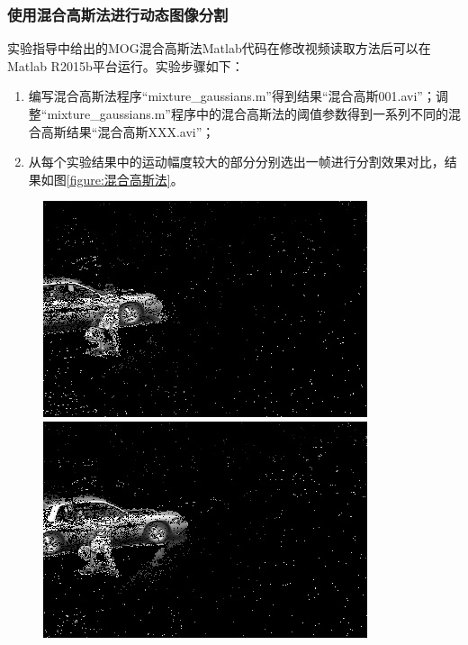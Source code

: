 \documentclass[a4paper]{ctexart}
\begin{document}
\subsubsection{使用混合高斯法进行动态图像分割}
实验指导中给出的MOG混合高斯法Matlab代码在修改视频读取方法后可以在Matlab R2015b平台运行。实验步骤如下：
\begin{enumerate}[label=\arabic*、]
	\item 编写混合高斯法程序“mixture\_gaussians.m”得到结果“混合高斯001.avi”；调整“mixture\_gaussians.m”程序中的混合高斯法的阈值参数得到一系列不同的混合高斯结果“混合高斯XXX.avi”；
	\item 从每个实验结果中的运动幅度较大的部分分别选出一帧进行分割效果对比，结果如图\ref{figure:混合高斯法}。
\end{enumerate}
\begin{figure}[htbp]
	\centering
	\begin{minipage}[t]{0.2\textwidth}
		\centering
		\includegraphics[width=\textwidth]{figure/frames/mixture_of_gaussians_output400.jpg}
	\end{minipage}
	\begin{minipage}[t]{0.2\textwidth}
		\centering
		\includegraphics[width=\textwidth]{figure/frames/mixture_of_gaussians_output405.jpg}

\end{minipage}
\end{figure}
\end{document}
